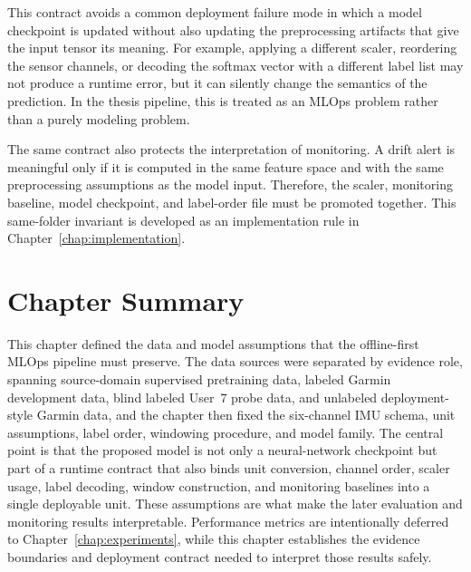 This contract avoids a common deployment failure mode in which a model checkpoint is updated without also updating the preprocessing artifacts that give the input tensor its meaning. For example, applying a different scaler, reordering the sensor channels, or decoding the softmax vector with a different label list may not produce a runtime error, but it can silently change the semantics of the prediction. In the thesis pipeline, this is treated as an MLOps problem rather than a purely modeling problem.

The same contract also protects the interpretation of monitoring. A drift alert is meaningful only if it is computed in the same feature space and with the same preprocessing assumptions as the model input. Therefore, the scaler, monitoring baseline, model checkpoint, and label-order file must be promoted together. This same-folder invariant is developed as an implementation rule in Chapter~\ref{chap:implementation}.

\section{Chapter Summary}
\label{sec:chapter4_summary}

This chapter defined the data and model assumptions that the offline-first MLOps pipeline must preserve. The data sources were separated by evidence role, spanning source-domain supervised pretraining data, labeled Garmin development data, blind labeled User~7 probe data, and unlabeled deployment-style Garmin data, and the chapter then fixed the six-channel IMU schema, unit assumptions, label order, windowing procedure, and model family. The central point is that the proposed model is not only a neural-network checkpoint but part of a runtime contract that also binds unit conversion, channel order, scaler usage, label decoding, window construction, and monitoring baselines into a single deployable unit. These assumptions are what make the later evaluation and monitoring results interpretable. Performance metrics are intentionally deferred to Chapter~\ref{chap:experiments}, while this chapter establishes the evidence boundaries and deployment contract needed to interpret those results safely.
